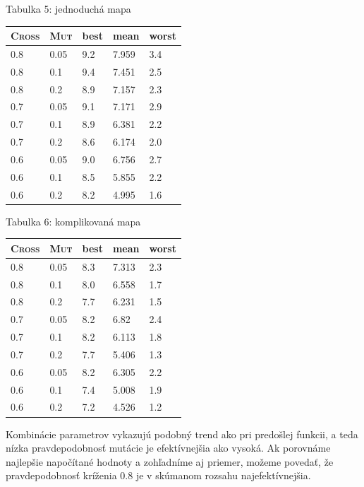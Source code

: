 \documentclass[10pt]{paper}
\begin{document}
\begin{center}
\begin{paracol}{2}
\setlength{\columnseprule}{0pt}
\setlength{\columnsep}{0em}
\begin{leftcolumn}
	Tabulka 5: jednoduchá mapa	
\begin{tabular}{|ll|lll|}
\hline
 \textsc{Cross} & \textsc{Mut}  & best & mean & worst \\ \hline
0.8 & 0.05 & 9.2 & 7.959 & 3.4 \\
0.8 & 0.1 & 9.4 & 7.451 & 2.5 \\
0.8 & 0.2 & 8.9 & 7.157 & 2.3 \\
\hline
0.7 & 0.05 & 9.1 & 7.171 & 2.9 \\
0.7 & 0.1 & 8.9 & 6.381 & 2.2 \\
0.7 & 0.2 & 8.6 & 6.174 & 2.0 \\
\hline
0.6 & 0.05 & 9.0 & 6.756 & 2.7 \\
0.6 & 0.1 & 8.5 & 5.855 & 2.2 \\
0.6 & 0.2 & 8.2 & 4.995 & 1.6 \\		
\hline
\end{tabular}
\end{leftcolumn}
\begin{rightcolumn}

	Tabulka 6: komplikovaná mapa
\begin{tabular}{|ll|lll|}
\hline
 \textsc{Cross} & \textsc{Mut}  & best & mean & worst \\ \hline

0.8 & 0.05 & 8.3 & 7.313 & 2.3 \\
0.8 & 0.1 & 8.0 & 6.558 & 1.7 \\
0.8 & 0.2 & 7.7 & 6.231 & 1.5\\
\hline
0.7 & 0.05 & 8.2 & 6.82 & 2.4 \\
0.7 & 0.1 & 8.2 & 6.113 & 1.8 \\
0.7 & 0.2 & 7.7 & 5.406 & 1.3 \\
\hline
0.6 & 0.05 & 8.2 & 6.305 & 2.2 \\
0.6 & 0.1 & 7.4 & 5.008 & 1.9 \\
0.6 & 0.2 & 7.2 & 4.526 & 1.2 \\
		
\hline
\end{tabular}		
\end{rightcolumn}
\end{paracol}
\end{center}

Kombinácie parametrov vykazujú podobný trend ako pri predošlej funkcii, a teda nízka pravdepodobnosť mutácie je efektívnejšia ako vysoká. Ak porovnáme najlepšie napočítané hodnoty a zohľadníme aj priemer, možeme povedať, že pravdepodobnosť kríženia 0.8 je v skúmanom rozsahu najefektívnejšia.
\end{document}
